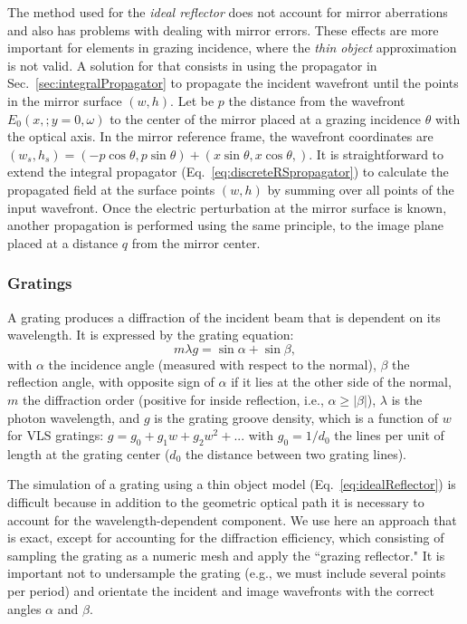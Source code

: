 \documentclass[preprint]{iucr}
\begin{document}
The method used for the {\it ideal reflector} does not account for mirror aberrations and also has problems with dealing with mirror errors. These effects are more important for elements in grazing incidence, where the {\it thin object} approximation is not valid. A solution for that consists in using the propagator in Sec.~\ref{sec:integralPropagator} to propagate the incident wavefront until the points in the mirror surface $(w,h)$. Let be $p$ the distance from the wavefront $E_0(x,;y=0,\omega)$ to the center of the mirror placed at a grazing incidence $\theta$ with the optical axis. In the mirror reference frame, the wavefront coordinates are $(w_s, h_s) =(-p \cos \theta, p \sin \theta) + (x \sin \theta, x \cos \theta,)$. It is straightforward to extend the integral propagator (Eq.~\ref{eq:discreteRSpropagator}) to calculate the propagated field at the surface points $(w,h)$ by summing over all points of the input wavefront. Once the electric perturbation at the mirror surface is known, another propagation is performed using the same principle, to the image plane placed at a distance $q$ from the mirror center. 

\subsubsection{Gratings}
\label{sec:grating}

A grating produces a diffraction of the incident beam that is dependent on its wavelength. It is expressed by the grating equation:
\begin{equation}
    m \lambda g = \sin\alpha + \sin\beta,
\end{equation}
with $\alpha$ the incidence angle (measured with respect to the normal), $\beta$ the reflection angle, with opposite sign of $\alpha$ if it lies at the other side of the normal, $m$ the diffraction order (positive for inside reflection, i.e., $\alpha \ge |\beta|$),
$\lambda$ is the photon wavelength, and $g$ is the grating groove density, which is a function of $w$ for VLS gratings: $g = g_0 + g_1 w + g_2 w^2 + ...$ with $g_0 = 1/d_0$ the lines per unit of length at the grating center ($d_0$ the distance between two grating lines).

The simulation of a grating using a thin object model (Eq.~\ref{eq:idealReflector}) is difficult because in addition to the geometric optical path it is necessary to account for the wavelength-dependent component. We use here an approach that is exact, except for accounting for the diffraction efficiency, which consisting of sampling the grating as a numeric mesh and apply the ``grazing reflector." It is important not to undersample the grating (e.g., we must include several points per period) and orientate the incident and image wavefronts with the correct angles $\alpha$ and $\beta$.
\end{document}
